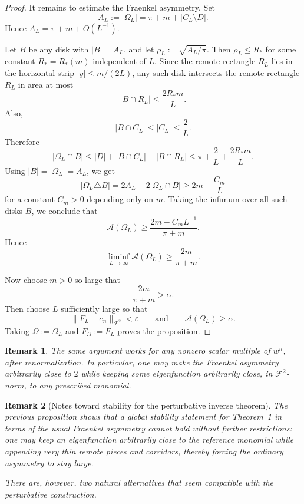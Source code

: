 \documentclass[a4paper,11pt,reqno]{amsart}
\newtheorem{remark}{Remark}[section]
\begin{document}
\begin{proof}
It remains to estimate the Fraenkel asymmetry. Set
\[
A_L:=|\Omega_L|=\pi+m+|C_L\setminus D|.
\]
Hence \(A_L=\pi+m+O(L^{-1})\).

Let \(B\) be any disk with \(|B|=A_L\), and let \(\rho_L:=\sqrt{A_L/\pi}\). Then
\(\rho_L\le R_*\) for some constant \(R_*=R_*(m)\) independent of \(L\). Since
the remote rectangle \(R_L\) lies in the horizontal strip \(|y|\le m/(2L)\), any such disk
intersects the remote rectangle \(R_L\) in area at most
\[
|B\cap R_L|
\le
\frac{2R_*m}{L}.
\]
Also,
\[
|B\cap C_L|\le |C_L|\le \frac{2}{L}.
\]
Therefore
\[
|\Omega_L\cap B|
\le
|D|+|B\cap C_L|+|B\cap R_L|
\le
\pi+\frac{2}{L}+\frac{2R_*m}{L}.
\]
Using \(|B|=|\Omega_L|=A_L\), we get
\[
|\Omega_L\triangle B|
=
2A_L-2|\Omega_L\cap B|
\ge
2m-\frac{C_m}{L}
\]
for a constant \(C_m>0\) depending only on \(m\). Taking the infimum over all
such disks \(B\), we conclude that
\[
\mathcal A(\Omega_L)
\ge
\frac{2m-C_mL^{-1}}{\pi+m}.
\]
Hence
\[
\liminf_{L\to\infty}\mathcal A(\Omega_L)\ge \frac{2m}{\pi+m}.
\]

Now choose \(m>0\) so large that
\[
\frac{2m}{\pi+m}>\alpha.
\]
Then choose \(L\) sufficiently large so that
\[
\|F_L-e_n\|_{\mathcal F^2}<\varepsilon
\qquad\text{and}\qquad
\mathcal A(\Omega_L)\ge \alpha.
\]
Taking \(\Omega:=\Omega_L\) and \(F_\Omega:=F_L\) proves the proposition.
\end{proof}

\begin{remark}
The same argument works for any nonzero scalar multiple of \(w^n\), after
renormalization. In particular, one may make the Fraenkel asymmetry arbitrarily
close to \(2\) while keeping some eigenfunction arbitrarily close, in
\(\mathcal F^2\)-norm, to any prescribed monomial.
\end{remark}

\begin{remark}[Notes toward stability for the perturbative inverse theorem]
The previous proposition shows that a global stability statement for
Theorem~1 in terms of the usual Fraenkel asymmetry cannot hold without further
restrictions: one may keep an eigenfunction arbitrarily close to the reference
monomial while appending very thin remote pieces and corridors, thereby forcing
the ordinary asymmetry to stay large.

There are, however, two natural alternatives that seem compatible with the
perturbative construction.
\end{remark}
\end{document}
